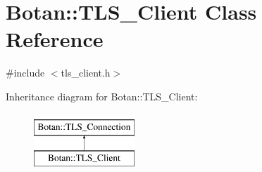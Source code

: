 \hypertarget{classBotan_1_1TLS__Client}{\section{Botan\-:\-:T\-L\-S\-\_\-\-Client Class Reference}
\label{classBotan_1_1TLS__Client}
}


{\ttfamily \#include $<$tls\-\_\-client.\-h$>$}

Inheritance diagram for Botan\-:\-:T\-L\-S\-\_\-\-Client\-:\begin{figure}[H]
\begin{center}
\leavevmode
\includegraphics[height=2.000000cm]{classBotan_1_1TLS__Client}
\end{center}
\end{figure}
